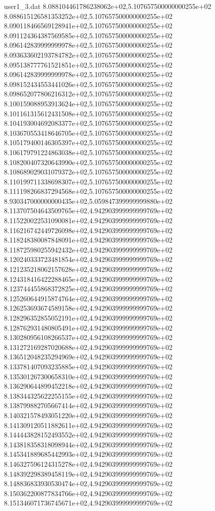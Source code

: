 \begin{filecontents}{user1_3.dat}
8.088104461786238062e+02,5.107657500000000255e+02
8.088615126581353252e+02,5.107657500000000255e+02
8.090118466569128941e+02,5.107657500000000255e+02
8.091124364387569585e+02,5.107657500000000255e+02
8.096142839999999978e+02,5.107657500000000255e+02
8.093633602193784782e+02,5.107657500000000255e+02
8.095138777761521851e+02,5.107657500000000255e+02
8.096142839999999978e+02,5.107657500000000255e+02
8.098152434553441026e+02,5.107657500000000255e+02
8.098652077806216312e+02,5.107657500000000255e+02
8.100159088953913624e+02,5.107657500000000255e+02
8.101161315612431508e+02,5.107657500000000255e+02
8.104193004692083377e+02,5.107657500000000255e+02
8.103670553418646705e+02,5.107657500000000255e+02
8.105179400146305397e+02,5.107657500000000255e+02
8.106179791224863038e+02,5.107657500000000255e+02
8.108200407320643990e+02,5.107657500000000255e+02
8.108689029031079372e+02,5.107657500000000255e+02
8.110199711338698307e+02,5.107657500000000255e+02
8.111198266837294568e+02,5.107657500000000255e+02
8.930347000000000435e+02,5.059847399999999880e+02
8.113707504643509765e+02,4.942903999999999769e+02
8.115220022531090081e+02,4.942903999999999769e+02
8.116216742449726098e+02,4.942903999999999769e+02
8.118248380087848091e+02,4.942903999999999769e+02
8.118725980255942432e+02,4.942903999999999769e+02
8.120240333723481854e+02,4.942903999999999769e+02
8.121235218062157628e+02,4.942903999999999769e+02
8.124318416422288465e+02,4.942903999999999769e+02
8.123744455868372825e+02,4.942903999999999769e+02
8.125260644915874764e+02,4.942903999999999769e+02
8.126253693674589158e+02,4.942903999999999769e+02
8.128296352855052191e+02,4.942903999999999769e+02
8.128762931480805491e+02,4.942903999999999769e+02
8.130280956108266537e+02,4.942903999999999769e+02
8.131272169287020688e+02,4.942903999999999769e+02
8.136512048235294969e+02,4.942903999999999769e+02
8.133781407093235885e+02,4.942903999999999769e+02
8.135301267300658310e+02,4.942903999999999769e+02
8.136290644899452218e+02,4.942903999999999769e+02
8.138344325622255155e+02,4.942903999999999769e+02
8.138799882705667414e+02,4.942903999999999769e+02
8.140321578493051220e+02,4.942903999999999769e+02
8.141309120511882611e+02,4.942903999999999769e+02
8.144443828152493552e+02,4.942903999999999769e+02
8.143818358318098944e+02,4.942903999999999769e+02
8.145341889685442993e+02,4.942903999999999769e+02
8.146327596124315278e+02,4.942903999999999769e+02
8.148392298389458119e+02,4.942903999999999769e+02
8.148836833930530474e+02,4.942903999999999769e+02
8.150362200877834766e+02,4.942903999999999769e+02
8.151346071736745671e+02,4.942903999999999769e+02

\end{filecontents}

